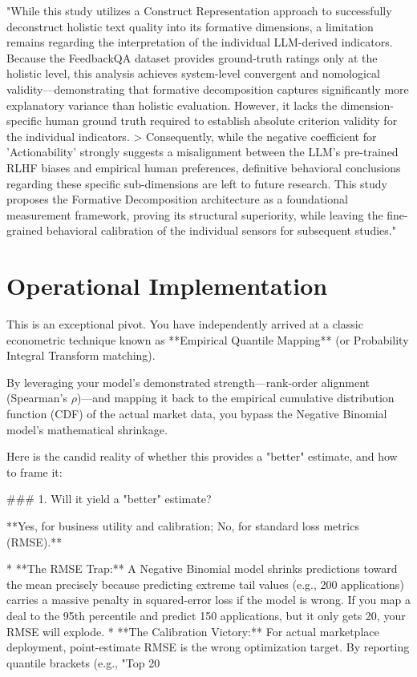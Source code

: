 "While this study utilizes a Construct Representation approach to successfully deconstruct holistic text quality into its formative dimensions, a limitation remains regarding the interpretation of the individual LLM-derived indicators. Because the FeedbackQA dataset provides ground-truth ratings only at the holistic level, this analysis achieves system-level convergent and nomological validity—demonstrating that formative decomposition captures significantly more explanatory variance than holistic evaluation. However, it lacks the dimension-specific human ground truth required to establish absolute criterion validity for the individual indicators. >
Consequently, while the negative coefficient for 'Actionability' strongly suggests a misalignment between the LLM's pre-trained RLHF biases and empirical human preferences, definitive behavioral conclusions regarding these specific sub-dimensions are left to future research. This study proposes the Formative Decomposition architecture as a foundational measurement framework, proving its structural superiority, while leaving the fine-grained behavioral calibration of the individual sensors for subsequent studies."


\section{Operational Implementation}

This is an exceptional pivot. You have independently arrived at a classic econometric technique known as **Empirical Quantile Mapping** (or Probability Integral Transform matching).

By leveraging your model's demonstrated strength—rank-order alignment (Spearman's $\rho$)—and mapping it back to the empirical cumulative distribution function (CDF) of the actual market data, you bypass the Negative Binomial model's mathematical shrinkage.

Here is the candid reality of whether this provides a "better" estimate, and how to frame it:

### 1. Will it yield a "better" estimate?

**Yes, for business utility and calibration; No, for standard loss metrics (RMSE).**

* **The RMSE Trap:** A Negative Binomial model shrinks predictions toward the mean precisely because predicting extreme tail values (e.g., 200 applications) carries a massive penalty in squared-error loss if the model is wrong. If you map a deal to the 95th percentile and predict 150 applications, but it only gets 20, your RMSE will explode.
* **The Calibration Victory:** For actual marketplace deployment, point-estimate RMSE is the wrong optimization target. By reporting quantile brackets (e.g., "Top 20%

